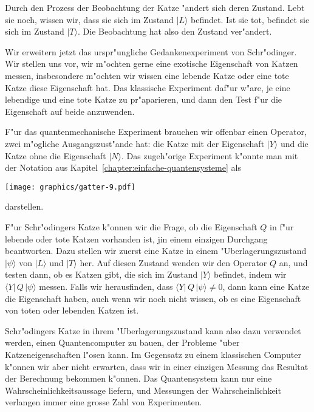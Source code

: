Durch den Prozess der Beobachtung der Katze "andert sich deren Zustand.
Lebt sie noch, wissen wir, dass sie sich im Zustand $|L\rangle$ befindet.
Ist sie tot, befindet sie sich im Zustand $|T\rangle$.
Die Beobachtung hat also den Zustand ver"andert.

Wir erweitern jetzt das urspr"ungliche Gedankenexperiment von Schr"odinger.
Wir stellen uns vor, wir m"ochten gerne eine exotische Eigenschaft von
Katzen messen, insbesondere m"ochten wir wissen eine lebende Katze oder
eine tote Katze diese Eigenschaft hat. Das klassische Experiment
daf"ur w"are, je eine lebendige und eine tote Katze zu pr"aparieren,
und dann den Test f"ur die Eigenschaft auf beide anzuwenden.

F"ur das quantenmechanische Experiment brauchen wir offenbar einen
Operator, zwei m"ogliche Ausgangszust"ande hat: die Katze mit der
Eigenschaft $|Y\rangle$ und die Katze ohne die Eigenschaft $|N\rangle$.
Das zugeh"orige Experiment k"onnte man mit der Notation aus
Kapitel~\ref{chapter:einfache-quantensysteme} als
\begin{center}
\texttt{[image: graphics/gatter-9.pdf]}
\end{center}
darstellen. 

F"ur Schr"odingers Katze k"onnen wir die Frage, ob die Eigenschaft $Q$
in f"ur lebende oder tote Katzen vorhanden ist, jin einem einzigen
Durchgang beantworten.
Dazu stellen wir zuerst eine Katze in einem "Uberlagerungszustand
$|\psi\rangle$ von $|L\rangle$ und $|T\rangle$ her.
Auf diesen Zustand wenden wir den Operator $Q$ an, und testen dann,
ob es Katzen gibt, die sich im Zustand $|Y\rangle$ befindet, indem
wir $\langle Y|\,Q\,|\psi\rangle$ messen.
Falls wir herausfinden, dass $\langle Y|\,Q\,|\psi\rangle\ne 0$,
dann kann eine Katze die Eigenschaft haben, auch wenn wir noch nicht
wissen, ob es eine Eigenschaft von toten oder lebenden Katzen ist.

Schr"odingers Katze in ihrem "Uberlagerungszustand kann also dazu
verwendet werden, einen Quantencomputer zu bauen, der Probleme "uber
Katzeneigenschaften l"osen kann.
Im Gegensatz zu einem klassischen Computer k"onnen wir aber nicht
erwarten, dass wir in einer einzigen Messung das Resultat der
Berechnung bekommen k"onnen.
Das Quantensystem kann nur eine Wahrscheinlichkeitsaussage liefern,
und Messungen der Wahrscheinlichkeit verlangen immer eine grosse Zahl
von Experimenten.

